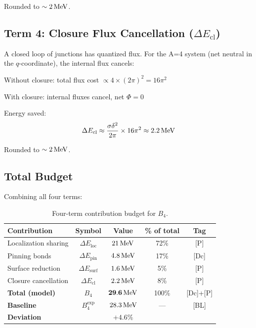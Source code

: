 Rounded to $\sim 2\,\mathrm{MeV}$. \tagP

\subsection{Term 4: Closure Flux Cancellation ($\Delta E_{\text{cl}}$)}
\label{sec:he4:cl}

A closed loop of junctions has quantized flux. For the A=4 system
(net neutral in the $q$-coordinate), the internal flux cancels:

\begin{derivationbox}
    Without closure: total flux cost $\propto 4 \times (2\pi)^2 = 16\pi^2$

    With closure: internal fluxes cancel, net $\Phi = 0$

    Energy saved:
    \begin{equation}
        \Delta E_{\text{cl}} \approx \frac{\sigma \delta^2}{2\pi}
        \times 16\pi^2 \approx 2.2\,\mathrm{MeV}
        \label{eq:cl_value}
    \end{equation}
    \tagP
\end{derivationbox}

Rounded to $\sim 2\,\mathrm{MeV}$.

\subsection{Total Budget}
\label{sec:he4:total}

Combining all four terms:

\begin{table}[h]
\centering
\caption{Four-term contribution budget for $B_4$.}
\label{tab:budget}
\begin{tabular}{lcccc}
    \toprule
    Contribution & Symbol & Value & \% of total & Tag \\
    \midrule
    Localization sharing & $\Delta E_{\text{loc}}$ & $21\,\mathrm{MeV}$ & 72\% & [P] \\
    Pinning bonds & $\Delta E_{\text{pin}}$ & $4.8\,\mathrm{MeV}$ & 17\% & [Dc] \\
    Surface reduction & $\Delta E_{\text{surf}}$ & $1.6\,\mathrm{MeV}$ & 5\% & [P] \\
    Closure cancellation & $\Delta E_{\text{cl}}$ & $2.2\,\mathrm{MeV}$ & 8\% & [P] \\
    \midrule
    \textbf{Total (model)} & $B_4$ & $\mathbf{29.6\,\mathrm{MeV}}$ & 100\% & [Dc]+[P] \\
    \textbf{Baseline} & $B_4^{\text{exp}}$ & $28.3\,\mathrm{MeV}$ & --- & [BL] \\
    \midrule
    \textbf{Deviation} & & $+4.6\%$ & & \\
    \bottomrule
\end{tabular}
\end{table}

